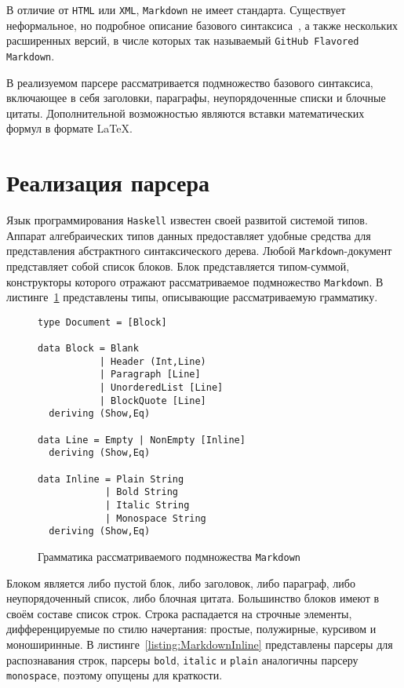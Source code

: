 В отличие от \lstinline{HTML} или \lstinline{XML}, \lstinline{Markdown} не имеет
стандарта. Существует неформальное, но подробное описание базового
синтаксиса~\autocite{MarkdownSyntax}, а также нескольких расширенных версий, в
числе которых так называемый \lstinline{GitHub Flavored Markdown}.

В реализуемом парсере рассматривается подмножество базового синтаксиса,
включающее в себя заголовки, параграфы, неупорядоченные списки и блочные цитаты.
Дополнительной возможностью являются вставки математических формул в формате
\LaTeX.

\section{Реализация парсера}

Язык программирования \lstinline{Haskell} известен своей развитой системой
типов. Аппарат алгебраических типов данных предоставляет удобные средства для
представления абстрактного синтаксического дерева. Любой 
\lstinline{Markdown}-документ представляет собой список блоков. Блок
представляется типом-суммой, конструкторы которого отражают рассматриваемое
подмножество \lstinline{Markdown}. В листинге~\ref{listing:MarkdownADT}
представлены типы, описывающие рассматриваемую грамматику.

\begin{figure}[t]
\begin{lstlisting}
type Document = [Block]

data Block = Blank
           | Header (Int,Line)
           | Paragraph [Line]
           | UnorderedList [Line]
           | BlockQuote [Line]
  deriving (Show,Eq)

data Line = Empty | NonEmpty [Inline]
  deriving (Show,Eq)

data Inline = Plain String
            | Bold String
            | Italic String
            | Monospace String
  deriving (Show,Eq)
\end{lstlisting}
\caption{Грамматика рассматриваемого подмножества \lstinline{Markdown}}
\label{listing:MarkdownADT}
\end{figure}

Блоком является либо пустой блок, либо заголовок, либо параграф, либо
неупорядоченный список, либо блочная цитата. Большинство блоков имеют в своём
составе список строк. Строка распадается на строчные элементы, дифференцируемые
по стилю начертания: простые, полужирные, курсивом и моноширинные.
В листинге~\ref{listing:MarkdownInline} представлены парсеры для распознавания
строк, парсеры \lstinline{bold}, \lstinline{italic} и \lstinline{plain}
аналогичны парсеру \lstinline{monospace}, поэтому опущены для краткости.

